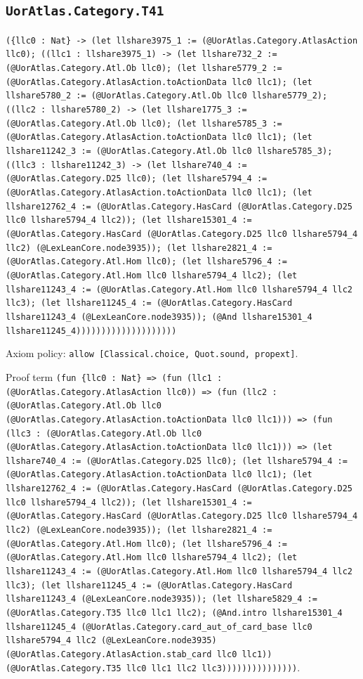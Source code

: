 \documentclass[11pt]{article}
\begin{document}
\subsection*{\texttt{UorAtlas.Category.T41}}
\noindent\texttt{(\{llc0 : Nat\} -> (let llshare3975\_1 := (@UorAtlas.Category.AtlasAction llc0); ((llc1 : llshare3975\_1) -> (let llshare732\_2 := (@UorAtlas.Category.Atl.Ob llc0); (let llshare5779\_2 := (@UorAtlas.Category.AtlasAction.toActionData llc0 llc1); (let llshare5780\_2 := (@UorAtlas.Category.Atl.Ob llc0 llshare5779\_2); ((llc2 : llshare5780\_2) -> (let llshare1775\_3 := (@UorAtlas.Category.Atl.Ob llc0); (let llshare5785\_3 := (@UorAtlas.Category.AtlasAction.toActionData llc0 llc1); (let llshare11242\_3 := (@UorAtlas.Category.Atl.Ob llc0 llshare5785\_3); ((llc3 : llshare11242\_3) -> (let llshare740\_4 := (@UorAtlas.Category.D25 llc0); (let llshare5794\_4 := (@UorAtlas.Category.AtlasAction.toActionData llc0 llc1); (let llshare12762\_4 := (@UorAtlas.Category.HasCard (@UorAtlas.Category.D25 llc0 llshare5794\_4 llc2)); (let llshare15301\_4 := (@UorAtlas.Category.HasCard (@UorAtlas.Category.D25 llc0 llshare5794\_4 llc2) (@LexLeanCore.node3935)); (let llshare2821\_4 := (@UorAtlas.Category.Atl.Hom llc0); (let llshare5796\_4 := (@UorAtlas.Category.Atl.Hom llc0 llshare5794\_4 llc2); (let llshare11243\_4 := (@UorAtlas.Category.Atl.Hom llc0 llshare5794\_4 llc2 llc3); (let llshare11245\_4 := (@UorAtlas.Category.HasCard llshare11243\_4 (@LexLeanCore.node3935)); (@And llshare15301\_4 llshare11245\_4))))))))))))))))))))}\par
\noindent Axiom policy: \texttt{allow [Classical.choice, Quot.sound, propext]}.\par
\noindent Proof term \texttt{(fun \{llc0 : Nat\} => (fun (llc1 : (@UorAtlas.Category.AtlasAction llc0)) => (fun (llc2 : (@UorAtlas.Category.Atl.Ob llc0 (@UorAtlas.Category.AtlasAction.toActionData llc0 llc1))) => (fun (llc3 : (@UorAtlas.Category.Atl.Ob llc0 (@UorAtlas.Category.AtlasAction.toActionData llc0 llc1))) => (let llshare740\_4 := (@UorAtlas.Category.D25 llc0); (let llshare5794\_4 := (@UorAtlas.Category.AtlasAction.toActionData llc0 llc1); (let llshare12762\_4 := (@UorAtlas.Category.HasCard (@UorAtlas.Category.D25 llc0 llshare5794\_4 llc2)); (let llshare15301\_4 := (@UorAtlas.Category.HasCard (@UorAtlas.Category.D25 llc0 llshare5794\_4 llc2) (@LexLeanCore.node3935)); (let llshare2821\_4 := (@UorAtlas.Category.Atl.Hom llc0); (let llshare5796\_4 := (@UorAtlas.Category.Atl.Hom llc0 llshare5794\_4 llc2); (let llshare11243\_4 := (@UorAtlas.Category.Atl.Hom llc0 llshare5794\_4 llc2 llc3); (let llshare11245\_4 := (@UorAtlas.Category.HasCard llshare11243\_4 (@LexLeanCore.node3935)); (let llshare5829\_4 := (@UorAtlas.Category.T35 llc0 llc1 llc2); (@And.intro llshare15301\_4 llshare11245\_4 (@UorAtlas.Category.card\_aut\_of\_card\_base llc0 llshare5794\_4 llc2 (@LexLeanCore.node3935) (@UorAtlas.Category.AtlasAction.stab\_card llc0 llc1)) (@UorAtlas.Category.T35 llc0 llc1 llc2 llc3)))))))))))))))}.\par
\end{document}
